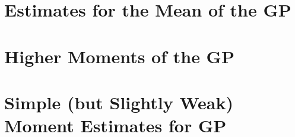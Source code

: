 \section{Estimates for the Mean of the GP}\label{sec:praos-mean}



\section{Higher Moments of the GP}\label{sec:praos-higher-moments}



\section{Simple (but Slightly Weak) Moment Estimates for GP}\label{sec:praos-simple-moments}



